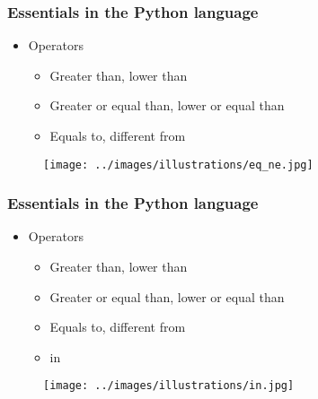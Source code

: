 \begin{frame}\frametitle{Essentials in the Python language}
   \begin{minipage}{0.48\linewidth}
      \begin{itemize}
         \item Operators
         \begin{itemize}
            \item Greater than, lower than
            \item Greater or equal than, lower or equal than
            \item Equals to, different from
         \end{itemize}
      \end{itemize}
   \end{minipage}
   \begin{minipage}{0.48\linewidth}
      \begin{figure}[H]
         \texttt{[image: ../images/illustrations/eq\_ne.jpg]}
      \end{figure}
   \end{minipage}
\end{frame}

\begin{frame}\frametitle{Essentials in the Python language}
   \begin{minipage}{0.48\linewidth}
      \begin{itemize}
         \item Operators
         \begin{itemize}
            \item Greater than, lower than
            \item Greater or equal than, lower or equal than
            \item Equals to, different from
            \item in
         \end{itemize}
      \end{itemize}
   \end{minipage}
   \begin{minipage}{0.48\linewidth}
      \begin{figure}[H]
         \texttt{[image: ../images/illustrations/in.jpg]}
      \end{figure}
   \end{minipage}
\end{frame}

